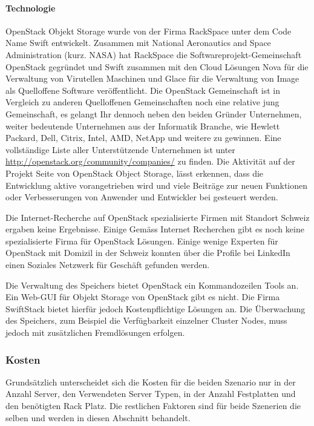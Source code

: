 \paragraph*{Technologie}
OpenStack Objekt Storage wurde von der Firma RackSpace unter dem Code Name Swift entwickelt. Zusammen mit National Aeronautics and Space Administration (kurz. NASA) hat RackSpace die Softwareprojekt-Gemeinschaft OpenStack gegründet und Swift zusammen mit den Cloud Lösungen Nova für die Verwaltung von Virutellen Maschinen und Glace für die Verwaltung von Image als Quelloffene Software veröffentlicht. Die OpenStack Gemeinschaft ist in Vergleich zu anderen Quelloffenen Gemeinschaften noch eine relative jung Gemeinschaft, es gelangt Ihr dennoch neben den beiden Gründer Unternehmen, weiter bedeutende Unternehmen aus der Informatik Branche, wie Hewlett Packard, Dell, Citrix, Intel, AMD, NetApp und weitere zu gewinnen. Eine vollständige Liste aller Unterstützende  Unternehmen ist unter \url{http://openstack.org/community/companies/} zu finden. Die Aktivität auf der Projekt Seite von OpenStack Object Storage, lässt erkennen, dass die Entwicklung aktive vorangetrieben wird und viele Beiträge zur neuen Funktionen oder Verbesserungen von Anwender und Entwickler bei gesteuert werden. \cite{Ohloh2012}

Die Internet-Recherche auf OpenStack spezialisierte Firmen mit Standort Schweiz ergaben keine Ergebnisse. Einige
Gemäss Internet Recherchen gibt es noch keine spezialisierte Firma für OpenStack Lösungen. Einige wenige Experten für OpenStack mit Domizil in der Schweiz konnten über die Profile bei LinkedIn einen Soziales Netzwerk für Geschäft gefunden werden. 

Die Verwaltung des Speichers bietet OpenStack ein Kommandozeilen Tools an. Ein Web-GUI für Objekt Storage von OpenStack gibt es nicht. Die Firma SwiftStack bietet hierfür jedoch Kostenpflichtige Lösungen an. Die Überwachung des Speichers, zum Beispiel die Verfügbarkeit einzelner Cluster Nodes, muss jedoch mit zusätzlichen Fremdlösungen erfolgen. 

\subsubsection{Kosten}
Grundsätzlich unterscheidet sich die Kosten für die beiden Szenario nur in der Anzahl Server, den Verwendeten Server Typen, in der Anzahl Festplatten und den benötigten Rack Platz. Die restlichen Faktoren sind für beide Szenerien die selben und werden in diesen Abschnitt behandelt.


